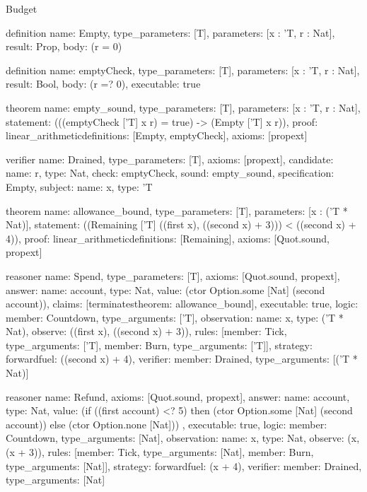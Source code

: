 \begin{lexlean}{Budget}
\begin{semanticmodule}
definition{
  name: Empty,
  type_parameters: [T],
  parameters: [x : 'T, r : Nat],
  result: Prop,
  body: (r = 0)
}

definition{
  name: emptyCheck,
  type_parameters: [T],
  parameters: [x : 'T, r : Nat],
  result: Bool,
  body: (r =? 0),
  executable: true
}

theorem{
  name: empty_sound,
  type_parameters: [T],
  parameters: [x : 'T, r : Nat],
  statement: (((emptyCheck ['T] x r) = true) -> (Empty ['T] x r)),
  proof: linear_arithmetic{definitions: [Empty, emptyCheck]},
  axioms: [propext]
}

verifier{
  name: Drained,
  type_parameters: [T],
  axioms: [propext],
  candidate: {name: r, type: Nat},
  check: emptyCheck,
  sound: empty_sound,
  specification: Empty,
  subject: {name: x, type: 'T}
}

theorem{
  name: allowance_bound,
  type_parameters: [T],
  parameters: [x : ('T * Nat)],
  statement: ((Remaining ['T] ((first x), ((second x) + 3))) < ((second x) + 4)),
  proof: linear_arithmetic{definitions: [Remaining]},
  axioms: [Quot.sound, propext]
}

reasoner{
  name: Spend,
  type_parameters: [T],
  axioms: [Quot.sound, propext],
  answer: {name: account, type: Nat, value: (ctor Option.some [Nat] (second account))},
  claims: [terminates{theorem: allowance_bound}],
  executable: true,
  logic: {member: Countdown, type_arguments: ['T]},
  observation: {name: x, type: ('T * Nat)},
  observe: ((first x), ((second x) + 3)),
  rules: [{member: Tick, type_arguments: ['T]}, {member: Burn, type_arguments: ['T]}],
  strategy: forward{fuel: ((second x) + 4)},
  verifier: {member: Drained, type_arguments: [('T * Nat)]}
}

reasoner{
  name: Refund,
  axioms: [Quot.sound, propext],
  answer: {
    name: account,
    type: Nat,
    value: (if ((first account) <? 5) then (ctor Option.some [Nat] (second account)) else (ctor Option.none [Nat]))
  },
  executable: true,
  logic: {member: Countdown, type_arguments: [Nat]},
  observation: {name: x, type: Nat},
  observe: (x, (x + 3)),
  rules: [{member: Tick, type_arguments: [Nat]}, {member: Burn, type_arguments: [Nat]}],
  strategy: forward{fuel: (x + 4)},
  verifier: {member: Drained, type_arguments: [Nat]}
}
\end{semanticmodule}
\end{lexlean}
